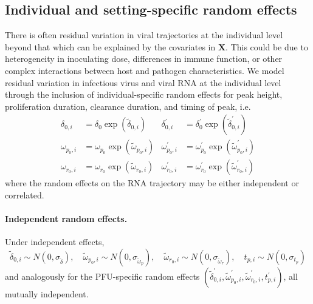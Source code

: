 \documentclass[12pt]{article}
\begin{document}
\subsection{Individual and setting-specific random effects}
There is often residual variation in viral trajectories at the individual level beyond that which can be explained by the covariates in $\mathbf{X}$. This could be due to heterogeneity in inoculating dose, differences in immune function, or other complex interactions between host and pathogen characteristics. We model residual variation in infectious virus and viral RNA at the individual level through the inclusion of individual-specific random effects for peak height, proliferation duration, clearance duration, and timing of peak, i.e. 
\begin{align*}
    \delta_{0,i} &= \delta_0 \exp(\tilde\delta_{0,i}) & \delta^\prime_{0,i} &= \delta^\prime_0 \exp(\tilde\delta^\prime_{0,i}) \\
    \omega_{p_0,i} &= \omega_{p_0} \exp(\tilde\omega_{p_0,i}) & \omega^\prime_{p_0,i} &= \omega^\prime_{p_0} \exp(\tilde\omega^\prime_{p_0,i}) \\
    \omega_{r_0,i}  &= \omega_{r_0} \exp(\tilde\omega_{r_0,i}) & \omega^\prime_{r_0,i}  &= \omega^\prime_{r_0} \exp(\tilde\omega^\prime_{r_0,i})
\end{align*}
where the random effects on the RNA trajectory may be either independent or correlated.

\paragraph{Independent random effects.} Under independent effects,
\begin{equation*}
\tilde\delta_{0,i} \sim N(0, \sigma_{\tilde\delta}), \quad
\tilde\omega_{p_0,i} \sim N(0, \sigma_{\tilde\omega_p}), \quad
\tilde\omega_{r_0,i} \sim N(0, \sigma_{\tilde\omega_r}), \quad
t_{p,i} \sim N(0, \sigma_{t_p})
\end{equation*}
and analogously for the PFU-specific random effects $(\tilde\delta^\prime_{0,i}, \tilde\omega^\prime_{p_0,i}, \tilde\omega^\prime_{r_0,i}, t^\prime_{p,i})$, all mutually independent.
\end{document}
